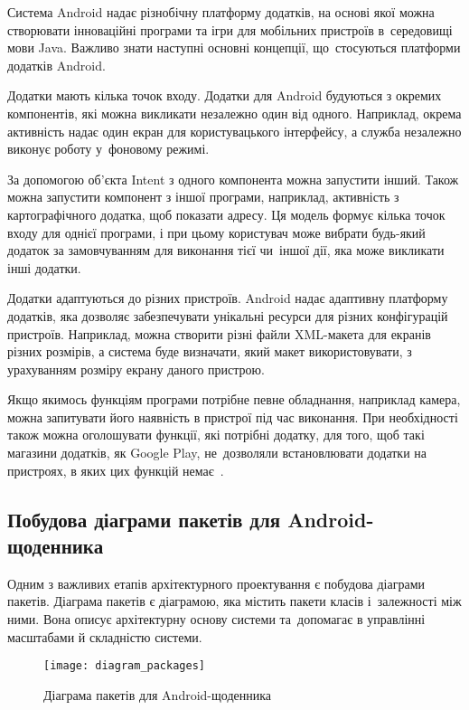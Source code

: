 \documentclass[../main.tex]{subfiles}
\begin{document}
Система Android надає різнобічну платформу додатків, на основі якої можна створювати інноваційні програми та ігри для мобільних пристроїв в~середовищі мови Java. Важливо знати наступні основні концепції, що~стосуються платформи додатків Android.

Додатки мають кілька точок входу.
Додатки для Android будуються з окремих компонентів, які можна викликати незалежно один від одного. Наприклад, окрема активність надає один екран для користувацького інтерфейсу, а служба незалежно виконує роботу у~фоновому режимі.

За допомогою об'єкта Intent з одного компонента можна запустити інший. Також можна запустити компонент з іншої програми, наприклад, активність з картографічного додатка, щоб показати адресу. Ця модель формує кілька точок входу для однієї програми, і при цьому користувач може вибрати будь-який додаток за замовчуванням для виконання тієї чи~іншої дії, яка може викликати інші додатки.

Додатки адаптуються до різних пристроїв.
Android надає адаптивну платформу додатків, яка дозволяє забезпечувати унікальні ресурси для різних конфігурацій пристроїв. Наприклад, можна створити різні файли \mbox{XML-макета} для екранів різних розмірів, а система буде визначати, який макет використовувати, з урахуванням розміру екрану даного пристрою.

Якщо якимось функціям програми потрібне певне обладнання, наприклад камера, можна запитувати його наявність в пристрої під час виконання. При необхідності також можна оголошувати функції, які потрібні додатку, для того, щоб такі магазини додатків, як Google Play, не~дозволяли встановлювати додатки на пристроях, в яких цих функцій немає~\cite{android_4}.

\subsection{Побудова діаграми пакетів для Android-щоденника}
Одним з важливих етапів архітектурного проектування є побудова діаграми пакетів. Діаграма пакетів є діаграмою, яка містить пакети класів і~залежності між ними. Вона описує архітектурну основу системи та~допомагає в управлінні масштабами й складністю системи. 

\begin{figure}[h]
	\centering
	\texttt{[image: diagram\_packages]}
	\caption{Діаграма пакетів для Android-щоденника}
	\label{diagram:packages}
\end{figure}
\end{document}
